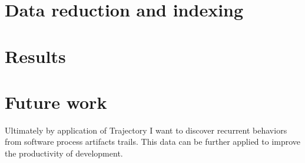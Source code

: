 \documentclass[a4paper,10pt]{article}
\numberwithin{equation}{subsection}
\begin{document}
\section{Data reduction and indexing}

\section{Results}


\section{Future work}
Ultimately by application of Trajectory I want to discover recurrent behaviors from
software process artifacts trails. This data can be further applied to improve the
productivity of development.


\clearpage


\clearpage




\end{document}
